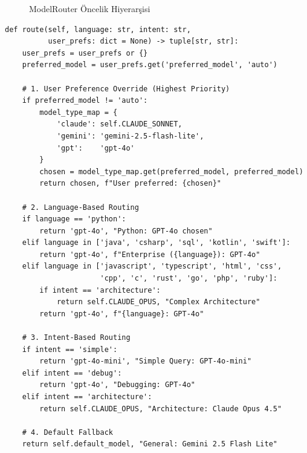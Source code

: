 \documentclass[12pt,a4paper]{article}
\begin{document}
\begin{figure}[H]
\centering
{}
\caption{ModelRouter Öncelik Hiyerarşisi}
\label{fig:router-priority}
\end{figure}

\begin{lstlisting}[style=pythonstyle, caption={ModelRouter.route() --- Yönlendirme Mantığı (model\_router.py)}, label=lst:router]
def route(self, language: str, intent: str, 
          user_prefs: dict = None) -> tuple[str, str]:
    user_prefs = user_prefs or {}
    preferred_model = user_prefs.get('preferred_model', 'auto')

    # 1. User Preference Override (Highest Priority)
    if preferred_model != 'auto':
        model_type_map = {
            'claude': self.CLAUDE_SONNET,
            'gemini': 'gemini-2.5-flash-lite',
            'gpt':    'gpt-4o'
        }
        chosen = model_type_map.get(preferred_model, preferred_model)
        return chosen, f"User preferred: {chosen}"

    # 2. Language-Based Routing
    if language == 'python':
        return 'gpt-4o', "Python: GPT-4o chosen"
    elif language in ['java', 'csharp', 'sql', 'kotlin', 'swift']:
        return 'gpt-4o', f"Enterprise ({language}): GPT-4o"
    elif language in ['javascript', 'typescript', 'html', 'css',
                      'cpp', 'c', 'rust', 'go', 'php', 'ruby']:
        if intent == 'architecture':
            return self.CLAUDE_OPUS, "Complex Architecture"
        return 'gpt-4o', f"{language}: GPT-4o"

    # 3. Intent-Based Routing
    if intent == 'simple':
        return 'gpt-4o-mini', "Simple Query: GPT-4o-mini"
    elif intent == 'debug':
        return 'gpt-4o', "Debugging: GPT-4o"
    elif intent == 'architecture':
        return self.CLAUDE_OPUS, "Architecture: Claude Opus 4.5"
    
    # 4. Default Fallback
    return self.default_model, "General: Gemini 2.5 Flash Lite"
\end{lstlisting}
\end{document}

